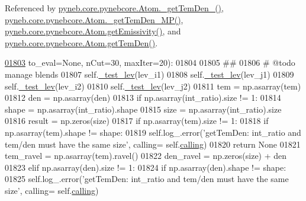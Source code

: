 Referenced by \hyperlink{pynebcore_8py_source_l01803}{pyneb.\+core.\+pynebcore.\+Atom.\+\_\+get\+Tem\+Den\+\_()}, \hyperlink{pynebcore_8py_source_l01980}{pyneb.\+core.\+pynebcore.\+Atom.\+\_\+get\+Tem\+Den\+\_\+\+M\+P()}, \hyperlink{pynebcore_8py_source_l01716}{pyneb.\+core.\+pynebcore.\+Atom.\+get\+Emissivity()}, and \hyperlink{pynebcore_8py_source_l02060}{pyneb.\+core.\+pynebcore.\+Atom.\+get\+Tem\+Den()}.


\begin{DoxyCode}
\hypertarget{classpyneb_1_1core_1_1pynebcore_1_1_atom_l01803}{}\hyperlink{classpyneb_1_1core_1_1pynebcore_1_1_atom_ad1d75f64b27a6acee079b5738b69dabe}{01803}                   to\_eval=\textcolor{keywordtype}{None}, nCut=30, maxIter=20):
01804 
01805         \textcolor{comment}{##}
01806         \textcolor{comment}{# @todo manage blends}
01807         self.\hyperlink{classpyneb_1_1core_1_1pynebcore_1_1_atom_ade3de73e8bdb814d01d2d9af98eba87f}{\_test\_lev}(lev\_i1)
01808         self.\hyperlink{classpyneb_1_1core_1_1pynebcore_1_1_atom_ade3de73e8bdb814d01d2d9af98eba87f}{\_test\_lev}(lev\_j1)
01809         self.\hyperlink{classpyneb_1_1core_1_1pynebcore_1_1_atom_ade3de73e8bdb814d01d2d9af98eba87f}{\_test\_lev}(lev\_i2)
01810         self.\hyperlink{classpyneb_1_1core_1_1pynebcore_1_1_atom_ade3de73e8bdb814d01d2d9af98eba87f}{\_test\_lev}(lev\_j2)
01811         tem = np.asarray(tem)
01812         den = np.asarray(den)
01813         \textcolor{keywordflow}{if} np.asarray(int\_ratio).size != 1:
01814             shape = np.asarray(int\_ratio).shape
01815             size = np.asarray(int\_ratio).size
01816             result = np.zeros(size) 
01817             \textcolor{keywordflow}{if} np.asarray(tem).size != 1:
01818                 \textcolor{keywordflow}{if} np.asarray(tem).shape != shape:
01819                     self.log\_.error(\textcolor{stringliteral}{'getTemDen: int\_ratio and tem/den must have the same size'}, calling=
      self.\hyperlink{classpyneb_1_1core_1_1pynebcore_1_1_atom_a373b7735acf4f528b54bddf373ad67a1}{calling})
01820                     \textcolor{keywordflow}{return} \textcolor{keywordtype}{None}
01821                 tem\_ravel = np.asarray(tem).ravel()
01822                 den\_ravel = np.zeros(size) + den
01823             \textcolor{keywordflow}{elif} np.asarray(den).size != 1:
01824                 \textcolor{keywordflow}{if} np.asarray(den).shape != shape:
01825                     self.log\_.error(\textcolor{stringliteral}{'getTemDen: int\_ratio and tem/den must have the same size'}, calling=
      self.\hyperlink{classpyneb_1_1core_1_1pynebcore_1_1_atom_a373b7735acf4f528b54bddf373ad67a1}{calling})

\end{DoxyCode}
